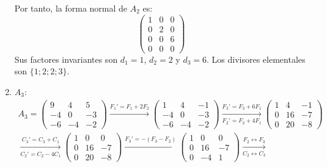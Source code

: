 \begin{ejercicio}
\begin{enumerate}
        Por tanto, la forma normal de $A_2$ es:
        \begin{equation*}
            \begin{pmatrix}
                1 & 0 & 0 \\
                0 & 2 & 0 \\
                0 & 0 & 6 \\
                0 & 0 & 0
            \end{pmatrix}
        \end{equation*}
        Sus factores invariantes son $d_1=1$, $d_2=2$ y $d_3=6$.
        Los divisores elementales son $\{1; 2; 2; 3\}$.
        \item $A_3$:
        \begin{multline*}
            A_3 = \begin{pmatrix}
                9 & 4 & 5 \\
                -4 & 0 & -3 \\
                -6 & -4 & -2
            \end{pmatrix}
            \xrightarrow{F_1'=F_1+2F_2}
            \begin{pmatrix}
                1 & 4 & -1 \\
                -4 & 0 & -3 \\
                -6 & -4 & -2
            \end{pmatrix}
            \xrightarrow[F_2'=F_2+4F_1]{F_3'=F_3+6F_1}
            \begin{pmatrix}
                1 & 4 & -1 \\
                0 & 16 & -7 \\
                0 & 20 & -8
            \end{pmatrix}\\
            \xrightarrow[C_2'=C_2-4C_1]{C_3'=C_3+C_1}
            \begin{pmatrix}
                1 & 0 & 0 \\
                0 & 16 & -7 \\
                0 & 20 & -8
            \end{pmatrix}
            \xrightarrow{F_3'=-(F_3-F_2)}
            \begin{pmatrix}
                1 & 0 & 0 \\
                0 & 16 & -7 \\
                0 & -4 & 1
            \end{pmatrix}
            \xrightarrow[C_2\leftrightarrow C_3]{F_2\leftrightarrow F_3}

\end{multline*}
\end{enumerate}
\end{ejercicio}
